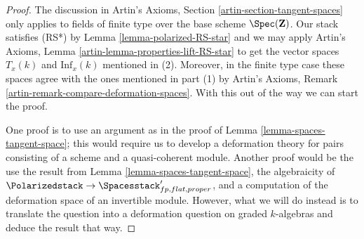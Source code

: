 \begin{proof}
The discussion in Artin's Axioms, Section \ref{artin-section-tangent-spaces}
only applies to fields of finite type over the base scheme $\Spec(\mathbf{Z})$.
Our stack satisfies (RS*) by Lemma \ref{lemma-polarized-RS-star}
and we may apply
Artin's Axioms, Lemma \ref{artin-lemma-properties-lift-RS-star}
to get the vector spaces $T_x(k)$ and $\text{Inf}_x(k)$
mentioned in (2). Moreover, in the finite type case these spaces agree with the
ones mentioned in part (1)
by Artin's Axioms, Remark \ref{artin-remark-compare-deformation-spaces}.
With this out of the way we can start the proof.

\medskip\noindent
One proof is to use an argument as in the proof of
Lemma \ref{lemma-spaces-tangent-space}; this would
require us to develop a deformation theory for pairs
consisting of a scheme and a quasi-coherent module.
Another proof would be the use the result from
Lemma \ref{lemma-spaces-tangent-space},
the algebraicity of
$\Polarizedstack \to \Spacesstack'_{fp, flat, proper}$,
and a computation of the deformation space of an
invertible module. However, what we will do instead
is to translate the question into a deformation question
on graded $k$-algebras and deduce the result that way.


\end{proof}
